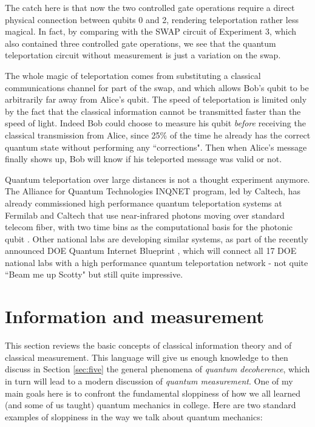 \documentclass[a4paper,11pt]{article}
\begin{document}
The catch here is that now the two controlled gate operations require a direct physical connection between qubits 0 and 2, rendering
teleportation rather less magical. In fact, by comparing with the SWAP circuit of Experiment 3, which also contained three controlled gate
operations, we see that the quantum teleportation circuit without measurement is just a variation on the swap.

The whole magic of teleportation comes from substituting a classical communications channel for part of the swap, and which allows
Bob's qubit to be arbitrarily far away from Alice's qubit. The speed of teleportation is limited only by the fact that the classical information
cannot be transmitted faster than the speed of light. Indeed Bob could choose to measure his qubit {\it before} receiving the classical
transmission from Alice, since 25\% of the time he already has the correct quantum state without performing any ``corrections".
Then when Alice's message finally shows up, Bob will know if his teleported message was valid or not. 

Quantum teleportation over large distances is not a thought experiment anymore. The Alliance for Quantum Technologies INQNET
program, led by Caltech, has already commissioned high performance
quantum teleportation systems at Fermilab and Caltech that use near-infrared photons moving over standard telecom fiber, with two time bins 
as the computational basis for the photonic qubit \cite{Spiropulu:2020}.
Other national labs are developing similar systems, as part of the recently announced DOE Quantum Internet Blueprint \cite{blueprint:2020},
which will connect all 17 DOE national labs with a high performance quantum teleportation network - not quite ``Beam me up Scotty" but still quite impressive. 





\section{Information and measurement}\label{sec:four}

This section reviews the basic concepts of classical information theory and of classical measurement.
This language will give us enough knowledge to then discuss in Section \ref{sec:five} the general phenomena
of {\it quantum decoherence}, which in turn will lead to a modern discussion of {\it quantum measurement}.
One of my main goals here is to confront the fundamental
sloppiness of how we all learned (and some of us taught) quantum mechanics in college. 
Here are two standard examples of sloppiness in the way we talk about quantum mechanics:
\end{document}
